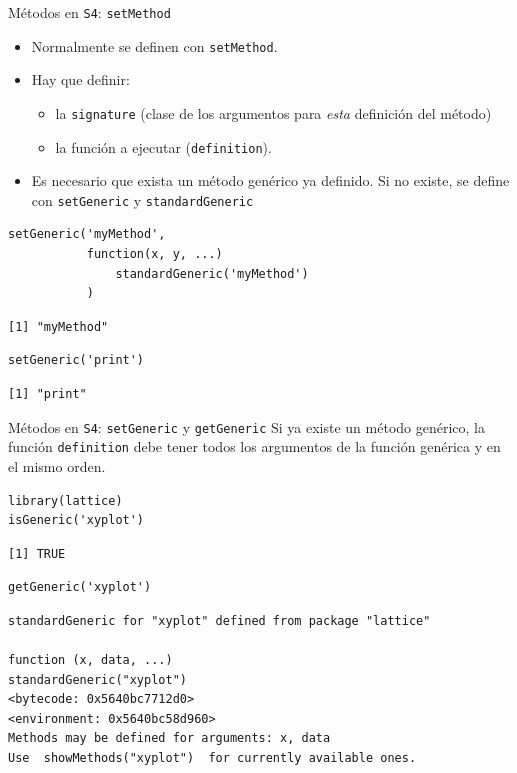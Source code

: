 \documentclass[xcolor={usenames,svgnames,dvipsnames}]{beamer}
\begin{document}
\begin{frame}[fragile,label={sec:org51c4315}]{Métodos en \texttt{S4}: \texttt{setMethod}}
 \begin{itemize}
\item Normalmente se definen con \texttt{setMethod}.
\item Hay que definir:
\begin{itemize}
\item la \texttt{signature} (clase de los argumentos para \emph{esta} definición del
método)
\item la función a ejecutar (\texttt{definition}).
\end{itemize}
\item Es necesario que exista un método genérico ya definido. Si no
existe, se define con \texttt{setGeneric} y \texttt{standardGeneric}
\end{itemize}
\lstset{language=r,label= ,caption= ,captionpos=b,numbers=none}
\begin{lstlisting}
setGeneric('myMethod',
           function(x, y, ...)
               standardGeneric('myMethod')
           )
\end{lstlisting}

\begin{verbatim}
[1] "myMethod"
\end{verbatim}

\lstset{language=r,label= ,caption= ,captionpos=b,numbers=none}
\begin{lstlisting}
setGeneric('print')
\end{lstlisting}

\begin{verbatim}
[1] "print"
\end{verbatim}
\end{frame}

\begin{frame}[fragile,label={sec:orge018b99}]{Métodos en \texttt{S4}: \texttt{setGeneric} y \texttt{getGeneric}}
 Si ya existe un método genérico, la función \texttt{definition} debe tener
todos los argumentos de la función genérica y en el mismo orden.

\lstset{language=r,label= ,caption= ,captionpos=b,numbers=none}
\begin{lstlisting}
library(lattice)  
isGeneric('xyplot')
\end{lstlisting}

\begin{verbatim}
[1] TRUE
\end{verbatim}

\lstset{language=r,label= ,caption= ,captionpos=b,numbers=none}
\begin{lstlisting}
getGeneric('xyplot')
\end{lstlisting}

\begin{verbatim}
standardGeneric for "xyplot" defined from package "lattice"

function (x, data, ...) 
standardGeneric("xyplot")
<bytecode: 0x5640bc7712d0>
<environment: 0x5640bc58d960>
Methods may be defined for arguments: x, data
Use  showMethods("xyplot")  for currently available ones.
\end{verbatim}
\end{frame}
\end{document}
